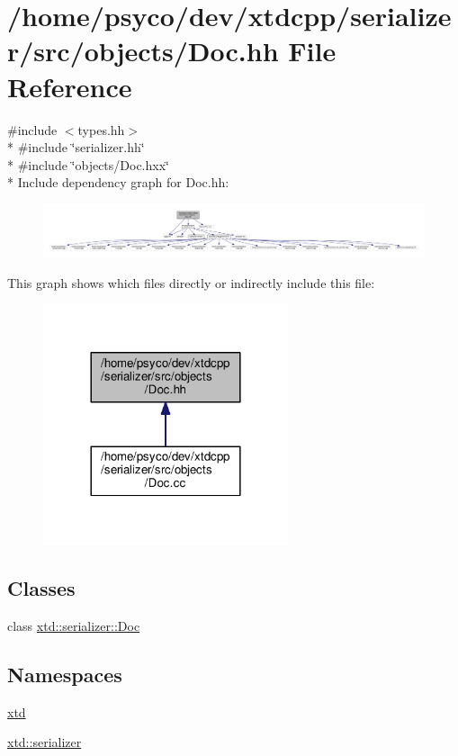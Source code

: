 \hypertarget{Doc_8hh}{}\section{/home/psyco/dev/xtdcpp/serializer/src/objects/\+Doc.hh File Reference}
\label{Doc_8hh}
{\ttfamily \#include $<$types.\+hh$>$}\\*
{\ttfamily \#include \char`\"{}serializer.\+hh\char`\"{}}\\*
{\ttfamily \#include \char`\"{}objects/\+Doc.\+hxx\char`\"{}}\\*
Include dependency graph for Doc.\+hh\+:
\nopagebreak
\begin{figure}[H]
\begin{center}
\leavevmode
\includegraphics[width=350pt]{Doc_8hh__incl}
\end{center}
\end{figure}
This graph shows which files directly or indirectly include this file\+:
\nopagebreak
\begin{figure}[H]
\begin{center}
\leavevmode
\includegraphics[width=204pt]{Doc_8hh__dep__incl}
\end{center}
\end{figure}
\subsection*{Classes}
\begin{DoxyCompactItemize}
\item 
class \hyperlink{classxtd_1_1serializer_1_1Doc}{xtd\+::serializer\+::\+Doc}
\end{DoxyCompactItemize}
\subsection*{Namespaces}
\begin{DoxyCompactItemize}
\item 
 \hyperlink{namespacextd}{xtd}
\item 
 \hyperlink{namespacextd_1_1serializer}{xtd\+::serializer}
\end{DoxyCompactItemize}
